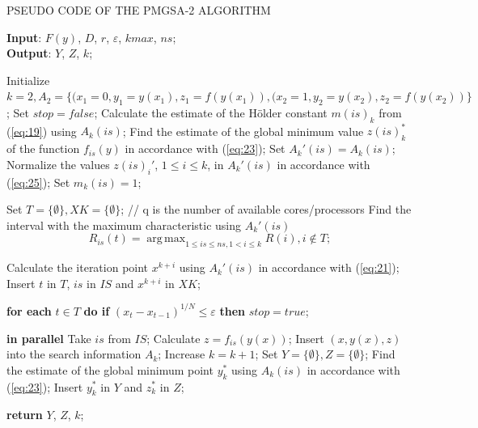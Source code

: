 \documentclass[review]{elsarticle}
\DeclareMathOperator*{\argmax}{arg\,max}
\begin{document}
\begin{algorithm}[]
\caption{PSEUDO CODE OF THE PMGSA-2 ALGORITHM} \label{alg:3}
\scriptsize
\hspace*{\algorithmicindent} \textbf{Input}: $F(y)$, $D$, $r$, $\varepsilon$, $kmax$, $ns$;\\
\hspace*{\algorithmicindent} \textbf{Output}: $Y$, $Z$, $k$;
\begin{algorithmic}[1]
\State Initialize $ k=2, A_2=\{(x_1=0,y_1=y(x_1),z_1=f(y(x_1)),(x_2=1,y_2=y(x_2),z_2=f(y(x_2))\} $;
\State Set $stop = false$;
	  \State Calculate the estimate of the H\"older constant $m(is)_k$ from (\ref{eq:19}) using $A_k(is)$;
		\State Find the estimate of the global minimum value $z(is)_k^*$ of the function $f_{is}(y)$ in accordance with (\ref{eq:23});
		\State Set $A_k'(is)=A_k (is)$;
		\State Normalize the values $z(is)_i'$, $1 \leq i \leq k$, in $A_k'(is)$ in accordance with (\ref{eq:25});
		\State Set $m_k (is)=1$;
	\EndFor
	
	\State Set $T = \{ \emptyset \}, XK = \{ \emptyset \}$;
	// q is the number of available cores/processors
	  \State Find the interval with the maximum characteristic using $A_k' (is)$
		\begin{equation*}
			R_{is} (t)= \argmax_{1 \leq is \leq ns, 1 < i \leq k} R(i),i \notin T;
	  \end{equation*}
		
		\State Calculate the iteration point $x^{k+i}$ using $A_k' (is)$ in accordance with (\ref{eq:21});
    \State Insert $t$ in $T$, $is$ in $IS$ and $x^{k+i}$ in $XK$;

	\EndFor
  \State \textbf{for each} $t \in T$ \textbf{do if} $(x_t-x_{t-1} )^{1/N} \leq \varepsilon$ \textbf{then} $stop = true$;
	
	   \textbf{in parallel}
		  \State Take $is$ from $IS$;
	    \State Calculate $z = f_{is}(y(x))$;
      \State Insert $(x, y(x), z)$ into the search information $A_k$;
      \State Increase $k = k + 1$;
	  \EndFor
  \EndIf
	\EndWhile
	\State Set $Y = \{ \emptyset \}, Z = \{ \emptyset \}$;
	  \State Find the estimate of the global minimum point $y_k^*$ using $A_k (is)$ in accordance with (\ref{eq:23});
	  \State Insert $y_k^*$ in $Y$ and $z_k^*$ in $Z$;
	\EndFor

\State \textbf{return} $Y$, $Z$, $k$;
\end{algorithmic}
\end{algorithm}
\end{document}

